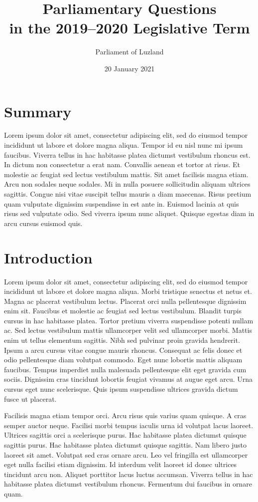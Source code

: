 \documentclass[12pt, oneside, a4paper]{article}
\title{Parliamentary Questions \\ in the 2019--2020 Legislative Term}
\author{Parliament of Luzland}
\date{20 January 2021}
\begin{document}
\maketitle 

\section*{Summary}
\renewcommand\baselinestretch{1}\selectfont
\noindent Lorem ipsum dolor sit amet, consectetur adipiscing elit, sed do eiusmod tempor incididunt ut labore et dolore magna aliqua. Tempor id eu nisl nunc mi ipsum faucibus. Viverra tellus in hac habitasse platea dictumst vestibulum rhoncus est. In dictum non consectetur a erat nam. Convallis aenean et tortor at risus. Et molestie ac feugiat sed lectus vestibulum mattis. Sit amet facilisis magna etiam. Arcu non sodales neque sodales. Mi in nulla posuere sollicitudin aliquam ultrices sagittis. Congue nisi vitae suscipit tellus mauris a diam maecenas. Risus pretium quam vulputate dignissim suspendisse in est ante in. Euismod lacinia at quis risus sed vulputate odio. Sed viverra ipsum nunc aliquet. Quisque egestas diam in arcu cursus euismod quis. 

\clearpage
\section*{Introduction}
Lorem ipsum dolor sit amet, consectetur adipiscing elit, sed do eiusmod tempor incididunt ut labore et dolore magna aliqua. Morbi tristique senectus et netus et. Magna ac placerat vestibulum lectus. Placerat orci nulla pellentesque dignissim enim sit. Faucibus et molestie ac feugiat sed lectus vestibulum. Blandit turpis cursus in hac habitasse platea. Tortor pretium viverra suspendisse potenti nullam ac. Sed lectus vestibulum mattis ullamcorper velit sed ullamcorper morbi. Mattis enim ut tellus elementum sagittis. Nibh sed pulvinar proin gravida hendrerit. Ipsum a arcu cursus vitae congue mauris rhoncus. Consequat ac felis donec et odio pellentesque diam volutpat commodo. Eget nunc lobortis mattis aliquam faucibus. Tempus imperdiet nulla malesuada pellentesque elit eget gravida cum sociis. Dignissim cras tincidunt lobortis feugiat vivamus at augue eget arcu. Urna cursus eget nunc scelerisque. Quis ipsum suspendisse ultrices gravida dictum fusce ut placerat.

Facilisis magna etiam tempor orci. Arcu risus quis varius quam quisque. A cras semper auctor neque. Facilisi morbi tempus iaculis urna id volutpat lacus laoreet. Ultrices sagittis orci a scelerisque purus. Hac habitasse platea dictumst quisque sagittis purus. Hac habitasse platea dictumst quisque sagittis. Nam libero justo laoreet sit amet. Volutpat sed cras ornare arcu. Leo vel fringilla est ullamcorper eget nulla facilisi etiam dignissim. Id interdum velit laoreet id donec ultrices tincidunt arcu non. Aliquet porttitor lacus luctus accumsan. Viverra tellus in hac habitasse platea dictumst vestibulum rhoncus. Fermentum dui faucibus in ornare quam.
\end{document}

